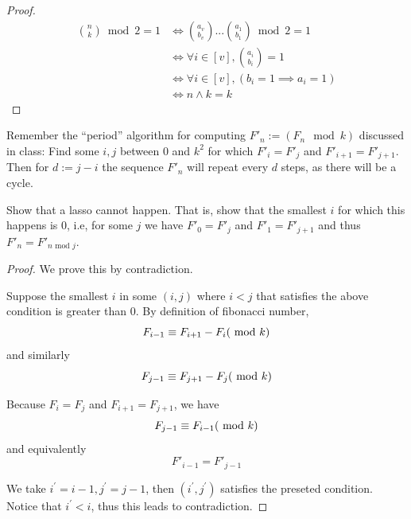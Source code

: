 \documentclass[11pt,a4paper,oneside]{article}
\begin{document}
\begin{problem}{5}
\begin{proof}
		\[
			\begin{split}
			{n \choose k} \bmod 2 = 1 &\Leftrightarrow {a_v \choose b_v}...{a_1 \choose b_1}\bmod 2=1 \\
			&\Leftrightarrow \forall i \in [v], {a_i \choose b_i}=1\\
			&\Leftrightarrow \forall i \in [v], (b_i=1\implies a_i=1)\\
			&\Leftrightarrow n \wedge k = k
			\end{split}
		\]		
    \end{proof}
\end{problem}

\begin{problem}{6}
    \statement
    Remember the ``period'' algorithm for computing $F'_n := (F_n \mod k)$ discussed in class:
    Find some $i,j$ between $0$ and $k^2$ for which 
    $F'_{i} =  F'_{j}$ and $F'_{i+1} = F'_{j+1}$. 
    Then for $d := j-i$ the sequence $F'_{n}$ will repeat every $d$ steps, as there will be a cycle.
    
    Show that a lasso cannot happen. That is, show 
    that the smallest $i$ for which this happens is $0$, i.e, for some $j$ we have
    $F'_0 = F'_j$ and $F'_1 = F'_{j+1}$ and thus $F'_n = F'_{n \text{ mod }  j}$.
    \solution
	\begin{proof}
	We prove this by contradiction.

	Suppose the smallest $i$ in some $(i, j)$ where $i < j$ that satisfies the above condition is greater than $0$.
	By definition of fibonacci number,
	$$F_{i-1} \equiv  F_{i+1}-F_i(\textnormal{ mod }  k)$$
	and similarly
	$$F_{j-1} \equiv  F_{j+1}-F_j(\textnormal{ mod }  k)$$
	
	Because $F_i = F_j$ and $F_{i+1} = F_{j+1}$, we have 
	$$F_{j-1} \equiv F_{i-1}(\textnormal{ mod }  k)$$
	and equivalently
	$$F'_{i-1} = F'_{j-1}$$

	We take $i^\prime = i - 1, j^\prime = j - 1$, then $(i^\prime, j ^ \prime)$ satisfies the preseted condition. Notice that $i^\prime < i$, thus this leads to contradiction.
	\end{proof}
\end{problem}
\end{document}
